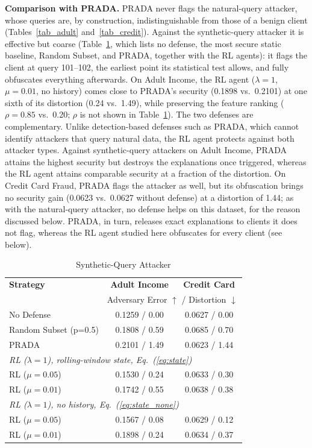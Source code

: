 \documentclass[conference]{IEEEtran}
\DeclareRobustCommand{\rev}[1]{#1}
\DeclareRobustCommand{\revnew}[1]{#1}
\begin{document}
\rev{\textbf{Comparison with PRADA.} PRADA never flags the natural-query attacker, whose queries are, by construction, indistinguishable from those of a benign client (Tables~\ref{tab_adult} and~\ref{tab_credit}). Against the synthetic-query attacker it is effective but coarse (Table~\ref{tab_synth}\revnew{, which lists no defense, the most secure static baseline, Random Subset, and PRADA, together with the RL agents}): it flags the client at query 101--102, the earliest point its statistical test allows, and fully obfuscates everything afterwards. On Adult Income, the RL agent ($\lambda=1$, $\mu=0.01$, no history) comes close to PRADA's security (0.1898 vs.\ 0.2101) at one sixth of its distortion (0.24 vs.\ 1.49), while preserving the feature ranking ($\rho=0.85$ vs.\ 0.20\revnew{; $\rho$ is not shown in Table~\ref{tab_synth}}). The two defenses are complementary. Unlike detection-based defenses such as PRADA, which cannot identify attackers that query natural data, the RL agent protects against both attacker types. Against synthetic-query attackers \revnew{on Adult Income}, PRADA attains the highest security but destroys the explanations once triggered, whereas the RL agent attains comparable security at a fraction of the distortion. \revnew{On Credit Card Fraud, PRADA flags the attacker as well, but its obfuscation brings no security gain (0.0623 vs.\ 0.0627 without defense) at a distortion of 1.44; as with the natural-query attacker, no defense helps on this dataset, for the reason discussed below.} PRADA, in turn, releases exact explanations to clients it does not flag, whereas the RL agent studied here obfuscates for every client (see below).}

\begin{table}[t]
\caption{\rev{Synthetic-Query Attacker}}
\begin{center}
\rev{
\begin{tabular}{lcc}
\toprule
\textbf{Strategy} & \textbf{Adult Income} & \textbf{Credit Card} \\
 & \multicolumn{2}{c}{\revnew{\footnotesize Adversary Error $\uparrow$ / Distortion $\downarrow$}} \\
\midrule
No Defense & 0.1259 / 0.00 & 0.0627 / 0.00 \\
Random Subset (p=0.5) & 0.1808 / 0.59 & 0.0685 / 0.70 \\
PRADA \cite{b17} & 0.2101 / 1.49 & 0.0623 / 1.44 \\
\midrule
\multicolumn{3}{l}{\textit{RL ($\lambda=1$), rolling-window state\revnew{, Eq.~(\ref{eq:state})}}} \\
RL ($\mu = 0.05$) & 0.1530 / 0.24 & 0.0633 / 0.30 \\
RL ($\mu = 0.01$) & 0.1742 / 0.55 & 0.0638 / 0.38 \\
\multicolumn{3}{l}{\textit{RL ($\lambda=1$), no history\revnew{, Eq.~(\ref{eq:state_none})}}} \\
RL ($\mu = 0.05$) & 0.1567 / 0.08 & 0.0629 / 0.12 \\
RL ($\mu = 0.01$) & 0.1898 / 0.24 & 0.0634 / 0.37 \\
\bottomrule
\end{tabular}
}
\label{tab_synth}
\end{center}
\end{table}
\end{document}
